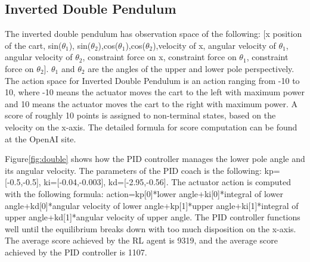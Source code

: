 \documentclass[journal]{IEEEtran}
\begin{document}
\subsection{Inverted Double Pendulum}
The inverted double pendulum has observation space of the following: [x position of the cart, sin($\theta_1$), sin($\theta_2$),cos($\theta_1$),cos($\theta_2$),velocity of x, angular velocity of $\theta_1$, angular velocity of $\theta_2$, constraint force on x, constraint force on $\theta_1$, constraint force on $\theta_2$]. $\theta_1$ and $\theta_2$ are the angles of the upper and lower pole perspectively. The action space for Inverted Double Pendulum is an action ranging from -10 to 10, where -10 means the actuator moves the cart to the left with maximum power and 10 means the actuator moves the cart to the right with maximum power. A score of roughly 10 points is assigned to non-terminal states, based on the velocity on the x-axis. The detailed formula for score computation can be found at the OpenAI site.

Figure\ref{fig:double} shows how the PID controller manages the lower pole angle and its angular velocity. The parameters of the PID coach is the following: kp=[-0.5,-0.5], ki=[-0.04,-0.003], kd=[-2.95,-0.56]. The actuator action is computed with the following formula: action=kp[0]*lower angle+ki[0]*integral of lower angle+kd[0]*angular velocity of lower angle+kp[1]*upper angle+ki[1]*integral of upper angle+kd[1]*angular velocity of upper angle. The PID controller functions well until the equilibrium breaks down with too much disposition on the x-axis. The average score achieved by the RL agent is 9319, and the average score achieved by the PID controller is 1107.
\end{document}
